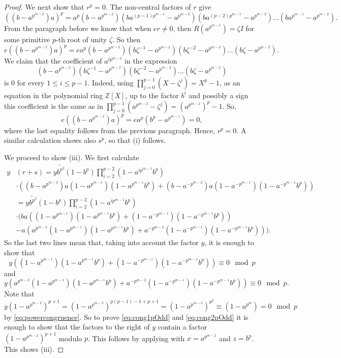 \documentclass[a4paper,10pt]{amsart}
\theoremstyle{definition}
\theoremstyle{remark}
\begin{document}
\begin{proof}
We next show that $r^p = 0$. The non-central factors of $r$ give
\[((b-a^{p^{m-2}})a)^p = a^p(b - a^{p^{m-2}})(ba^{(p-1)p^{m-1}} - a^{p^{m-2}})(ba^{(p-2)p^{m-1}} - a^{p^{m-2}})...(ba^{p^{m-1}} - a^{p^{m-2}}). \]
From the paragraph before we know that when $er \neq 0$, then $R(a^{p^{m-1}}) = \zeta I$ for some primitive $p$-th root of unity $\zeta$. So then
\[e((b-a^{p^{m-2}})a)^p = ea^p(b - a^{p^{m-2}})(b\zeta^{-1} - a^{p^{m-2}})(b\zeta^{-2} - a^{p^{m-2}})...(b\zeta - a^{p^{m-2}}). \]
We claim that the coefficient of $a^{ip^{m-2}}$ in the expression 
\[(b - a^{p^{m-2}})(b\zeta^{-1} - a^{p^{m-2}})(b\zeta^{-2} - a^{p^{m-2}})...(b\zeta - a^{p^{m-2}})\]
is $0$ for every $1 \leq i \leq p-1$. Indeed, using $\prod_{j=0}^{p-1}(X-\zeta^j) = X^p - 1$, as an equation in the polynomial ring $\mathbb{Z}[X]$, up to the factor $b^i$ and possibly a sign this coefficient is the same as in $\prod_{j=0}^{p-1} (a^{p^{m-2}} - \zeta^j) = (a^{p^{m-2}})^p - 1$. So,
\[e((b-a^{p^{m-2}})a)^p = ea^p(b^p - a^{p^{m-1}}) = 0, \]
where the last equality follows from the previous paragraph. Hence, $r^p = 0$. A similar calculation shows also $s^p$, so that (i) follows.

We proceed to show (iii). 
We first calculate
\begin{align*}
y&(r+s) = y\widetilde{b^{p^2}}(1-b^p)\prod_{i=2}^{p-2}(1-a^{ip^{m-1}}b^p) \\
 & \cdot ((b-a^{p^{m-2}})a(1-a^{p^{m-1}})(1-a^{p^{m-1}}b^p) + (b-a^{-p^{m-2}})a(1-a^{-p^{m-1}})(1-a^{-p^{m-1}}b^p)) \\
 &= y\widetilde{b^{p^2}}(1-b^p)\prod_{i=2}^{p-2}(1-a^{ip^{m-1}}b^p) \\
 &\cdot (ba((1-a^{p^{m-1}})(1-a^{p^{m-1}}b^p) + (1-a^{-p^{m-1}})(1-a^{-p^{m-1}}b^p)) \\
 &  -a(a^{p^{m-2}}(1-a^{p^{m-1}})(1-a^{p^{m-1}}b^p)+a^{-p^{m-2}}(1-a^{-p^{m-1}})(1-a^{-p^{m-1}}b^p))).
\end{align*}
So the last two lines mean that, taking into account the factor $y$, it is enough to show that
\begin{equation}\label{eq:cong1pOdd}
y ((1-a^{p^{m-1}})(1-a^{p^{m-1}}b^p) + (1-a^{-p^{m-1}})(1-a^{-p^{m-1}}b^p)) \equiv 0 \mod p
\end{equation}
and 
\begin{equation}\label{eq:cong2pOdd}
y(a^{p^{m-2}}(1-a^{p^{m-1}})(1-a^{p^{m-1}}b^p) + a^{-p^{m-2}}(1-a^{-p^{m-1}})(1-a^{-p^{m-1}}b^p)) \equiv 0 \mod p.
\end{equation}
Note that 
\[y(1-a^{p^{m-2}})^{p+1} = (1-a^{p^{m-2}})^{p(p-1)-1+p+1} = (1-a^{p^{m-2}})^{p^2} \equiv (1 - a^{p^m}) = 0 \mod p\]
 by \eqref{eq:powercongruence}. So to prove \eqref{eq:cong1pOdd} and \eqref{eq:cong2pOdd} it is enough to show that the factors to the right of $y$ contain a factor $(1-a^{p^{m-2}})^{p+1}$ modulo $p$. This follows by applying  with $x = a^{p^{m-2}}$ and $z = b^p$. This shows (iii).


\end{proof}
\end{document}
